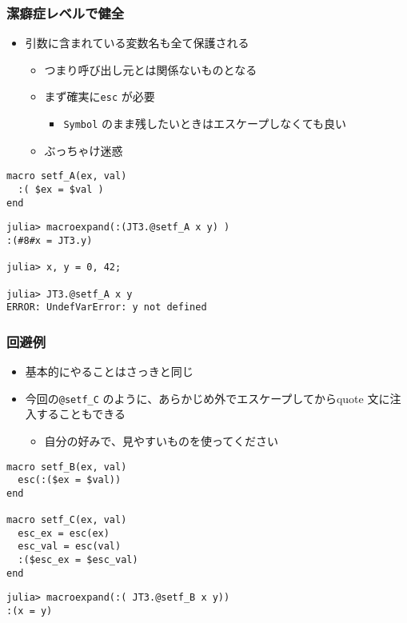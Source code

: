 \begin{frame}[containsverbatim]
\frametitle{潔癖症レベルで健全}
\begin{itemize}
  \item 引数に含まれている変数名も全て保護される
    \begin{itemize}
      \item つまり呼び出し元とは関係ないものとなる
      \item まず確実に\verb|esc| が必要
        \begin{itemize}
          \item \verb|Symbol| のまま残したいときはエスケープしなくても良い
        \end{itemize}
      \item ぶっちゃけ迷惑
    \end{itemize}
\end{itemize}
\begin{lstlisting}
macro setf_A(ex, val)
  :( $ex = $val )
end
\end{lstlisting}
\begin{lstlisting}
julia> macroexpand(:(JT3.@setf_A x y) )
:(#8#x = JT3.y)

julia> x, y = 0, 42;

julia> JT3.@setf_A x y
ERROR: UndefVarError: y not defined
\end{lstlisting}
\end{frame}

\begin{frame}[containsverbatim]
\frametitle{回避例}
\begin{itemize}
  \item 基本的にやることはさっきと同じ
  \item 今回の\verb|@setf_C| のように、あらかじめ外でエスケープしてからquote 文に注入することもできる
    \begin{itemize}
      \item 自分の好みで、見やすいものを使ってください
    \end{itemize}
\end{itemize}
\begin{lstlisting}
macro setf_B(ex, val)
  esc(:($ex = $val))
end

macro setf_C(ex, val)
  esc_ex = esc(ex)
  esc_val = esc(val)
  :($esc_ex = $esc_val)
end
\end{lstlisting}
\begin{lstlisting}
julia> macroexpand(:( JT3.@setf_B x y))
:(x = y)
\end{lstlisting}
\end{frame}

